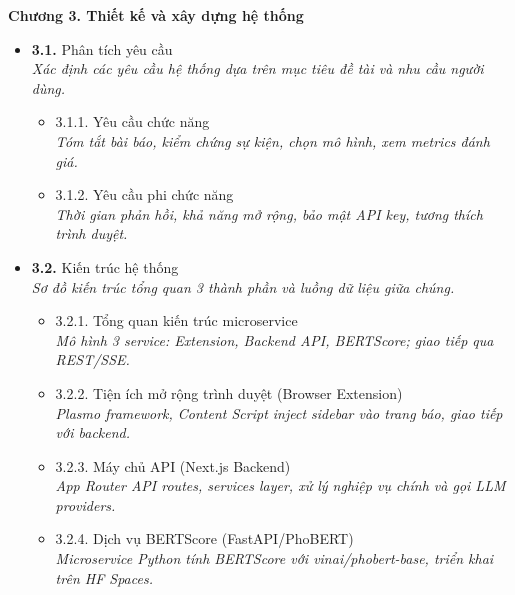 \documentclass[a4paper,12pt]{article}
\begin{document}
\vspace{0.5cm}

{\fontsize{13pt}{15pt}\selectfont\bfseries Chương 3. Thiết kế và xây dựng hệ thống}

\begin{itemize}[leftmargin=1cm, labelsep=0.3cm, itemsep=1pt, label={}]
  \item \textbf{3.1.} Phân tích yêu cầu \\
  {\small\itshape Xác định các yêu cầu hệ thống dựa trên mục tiêu đề tài và nhu cầu người dùng.}
  \begin{itemize}[leftmargin=1cm, itemsep=0pt, label={}]
    \item 3.1.1. Yêu cầu chức năng \\
      {\small\itshape Tóm tắt bài báo, kiểm chứng sự kiện, chọn mô hình, xem metrics đánh giá.}
    \item 3.1.2. Yêu cầu phi chức năng \\
      {\small\itshape Thời gian phản hồi, khả năng mở rộng, bảo mật API key, tương thích trình duyệt.}
  \end{itemize}

  \item \textbf{3.2.} Kiến trúc hệ thống \\
  {\small\itshape Sơ đồ kiến trúc tổng quan 3 thành phần và luồng dữ liệu giữa chúng.}
  \begin{itemize}[leftmargin=1cm, itemsep=0pt, label={}]
    \item 3.2.1. Tổng quan kiến trúc microservice \\
      {\small\itshape Mô hình 3 service: Extension, Backend API, BERTScore; giao tiếp qua REST/SSE.}
    \item 3.2.2. Tiện ích mở rộng trình duyệt (Browser Extension) \\
      {\small\itshape Plasmo framework, Content Script inject sidebar vào trang báo, giao tiếp với backend.}
    \item 3.2.3. Máy chủ API (Next.js Backend) \\
      {\small\itshape App Router API routes, services layer, xử lý nghiệp vụ chính và gọi LLM providers.}
    \item 3.2.4. Dịch vụ BERTScore (FastAPI/PhoBERT) \\
      {\small\itshape Microservice Python tính BERTScore với vinai/phobert-base, triển khai trên HF Spaces.}
  \end{itemize}


\end{itemize}
\end{document}

